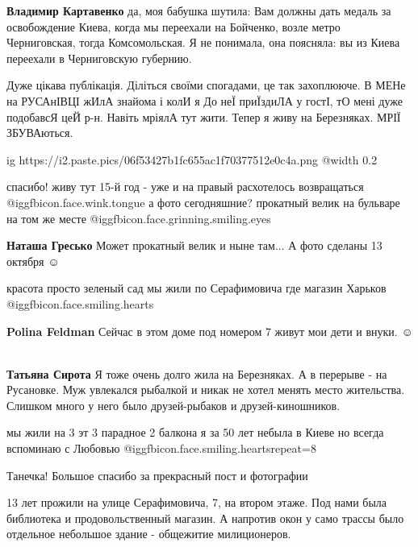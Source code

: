 \begin{itemize}
\begin{itemize}
\textbf{Владимир Картавенко} да, моя бабушка шутила: Вам должны дать медаль за освобождение Киева, когда мы переехали на Бойченко, возле метро Черниговская, тогда Комсомольская. Я не понимала, она поясняла: вы из Киева переехали в Черниговскую губернию.
\end{itemize} %


Дуже цікава публікація. Діліться своїми спогадами, це так захоплююче. В МЕНе на
РУСАнІВЦІ жИлА знайома і колИ я До неЇ приЇздиЛА у гостІ, тО мені дуже
подобавсЯ цеЙ р-н. Навіть мріялА тут жити. Тепер я живу на Березняках. МРІЇ
ЗБУВАються.


\ifcmt
  ig https://i2.paste.pics/06f53427b1fc655ac1f70377512e0c4a.png
  @width 0.2
\fi


спасибо! живу тут 15-й год - уже и на правый расхотелось возвращаться @igg{fbicon.face.wink.tongue}  а фото
сегодняшние? прокатный велик на бульваре на том же месте @igg{fbicon.face.grinning.smiling.eyes} 

\textbf{Наташа Гресько} Может прокатный велик и ныне там...
А фото сделаны 13 октября ☺ ️ 


красота просто зеленый сад мы жили по Серафимовича где магазин Харьков @igg{fbicon.face.smiling.hearts} 

\begin{itemize} %
\textbf{Polina Feldman} Сейчас в этом доме под номером 7 живут мои дети и внуки. ☺ ️ 

\textbf{Татьяна Сирота} Я тоже очень долго жила на Березняках. А в перерыве - на Русановке. Муж увлекался рыбалкой и никак не хотел менять место жительства. Слишком много у него было друзей-рыбаков и друзей-киношников.

мы жили на 3 эт 3 парадное 2 балкона я за 50 лет небыла в Киеве но всегда вспоминаю с Любовью @igg{fbicon.face.smiling.hearts}{repeat=8} 
\end{itemize} %

Танечка!
Большое спасибо за прекрасный пост и фотографии


13 лет прожили на улице Серафимовича, 7, на втором этаже. Под нами была
библиотека и продовольственный магазин. А напротив окон у само трассы было
отдельное небольшое здание - общежитие милиционеров.


\end{itemize}
